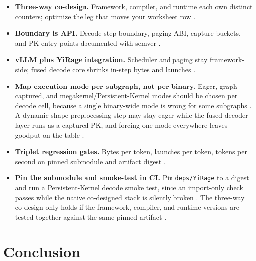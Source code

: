 \begin{itemize}
\item \textbf{Three-way co-design.} Framework, compiler, and runtime each own distinct counters; optimize the leg that moves your worksheet row \citep{patel2025llminference,yirage2026,kwon2023vllm,taxbreak2026,memoryfloor2026,chen2020compilerbasedhardw,dlbook}.
\item \textbf{Boundary is API.} Decode step boundary, paging ABI, capture buckets, and PK entry points documented with semver \citep{kwon2023vllm,nvidia2024cudagraphs,yirage2026,chen2020compilerbasedhardw,patel2025llminference}.
\item \textbf{vLLM plus YiRage integration.} Scheduler and paging stay framework-side; fused decode core shrinks in-step bytes and launches \citep{kwon2023vllm,yirage2026,chen2020compilerbasedhardw,patel2025llminference,memoryfloor2026,taxbreak2026}.
\item \textbf{Map execution mode per subgraph, not per binary.} Eager, graph-captured, and megakernel/Persistent-Kernel modes should be chosen per decode cell, because a single binary-wide mode is wrong for some subgraphs \citep{nvidia2024cudagraphs,yirage2026}. A dynamic-shape preprocessing step may stay eager while the fused decoder layer runs as a captured PK, and forcing one mode everywhere leaves goodput on the table \citep{taxbreak2026,memoryfloor2026}.
\item \textbf{Triplet regression gates.} Bytes per token, launches per token, tokens per second on pinned submodule and artifact digest \citep{taxbreak2026,memoryfloor2026,yirage2026,chen2020compilerbasedhardw,patel2025llminference,kwon2023vllm,dlbook}.
\item \textbf{Pin the submodule and smoke-test in CI.} Pin \texttt{deps/YiRage} to a digest and run a Persistent-Kernel decode smoke test, since an import-only check passes while the native co-designed stack is silently broken \citep{yirage2026,chen2020compilerbasedhardw}. The three-way co-design only holds if the framework, compiler, and runtime versions are tested together against the same pinned artifact \citep{patel2025llminference,dlbook}.
\end{itemize}

\section{Conclusion}
\label{sec:ch30_conclusion}

